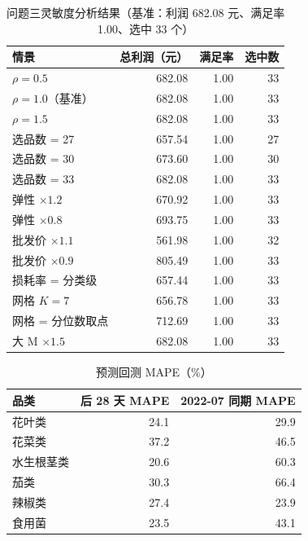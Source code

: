 \begin{appendices}
\begin{table}[H]
\centering
\caption{问题三灵敏度分析结果（基准：利润 682.08 元、满足率 1.00、选中 33 个）}
\label{tab:q3_sensitivity}
\begin{tabular}{l r r r}
\toprule
情景 & 总利润（元） & 满足率 & 选中数 \\
\midrule
$\rho=0.5$   & 682.08 & 1.00 & 33 \\
$\rho=1.0$（基准） & 682.08 & 1.00 & 33 \\
$\rho=1.5$   & 682.08 & 1.00 & 33 \\
选品数 = 27 & 657.54 & 1.00 & 27 \\
选品数 = 30 & 673.60 & 1.00 & 30 \\
选品数 = 33 & 682.08 & 1.00 & 33 \\
弹性 $\times 1.2$ & 670.92 & 1.00 & 33 \\
弹性 $\times 0.8$ & 693.75 & 1.00 & 33 \\
批发价 $\times 1.1$ & 561.98 & 1.00 & 32 \\
批发价 $\times 0.9$ & 805.49 & 1.00 & 33 \\
损耗率 = 分类级 & 657.44 & 1.00 & 33 \\
网格 $K=7$ & 656.78 & 1.00 & 33 \\
网格 = 分位数取点 & 712.69 & 1.00 & 33 \\
大 M $\times 1.5$ & 682.08 & 1.00 & 33 \\
\bottomrule
\end{tabular}
\end{table}

\begin{table}[H]
\centering
\caption{预测回测 MAPE（\%）}
\label{tab:backtest}
\begin{tabular}{l r r}
\toprule
品类 & 后 28 天 MAPE & 2022-07 同期 MAPE \\
\midrule
花叶类 & 24.1 & 29.9 \\
花菜类 & 37.2 & 46.5 \\
水生根茎类 & 20.6 & 60.3 \\
茄类 & 30.3 & 66.4 \\
辣椒类 & 27.4 & 23.9 \\
食用菌 & 23.5 & 43.1 \\
\bottomrule
\end{tabular}
\end{table}


\end{appendices}
